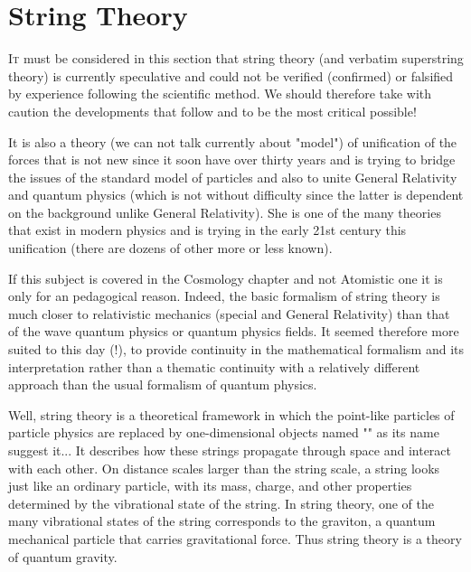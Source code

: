 	\newpage
	\thispagestyle{empty}
	\mbox{}
	\section{String Theory}
	\lettrine[lines=4]{\color{BrickRed}I}t must be considered in this section that string theory (and verbatim superstring theory) is currently speculative and could not be verified (confirmed) or falsified by experience following the scientific method. We should therefore take with caution the developments that follow and to be the most critical possible!
	
	It is also a theory (we can not talk currently about "model") of unification of the forces that is not new since it soon have over thirty years and is trying to bridge the issues of the standard model of particles and also to unite General Relativity and quantum physics (which is not without difficulty since the latter is dependent on the background unlike General Relativity). She is one of the many theories that exist in modern physics and is trying in the early 21st century this unification (there are dozens of other more or less known).
	
	\begin{tcolorbox}[title=Remark,colframe=black,arc=10pt]
	If this subject is covered in the Cosmology chapter and not Atomistic one it is only for an pedagogical reason. Indeed, the basic formalism of string theory is much closer to relativistic mechanics (special and General Relativity) than that of the wave quantum physics or quantum physics fields. It seemed therefore more suited to this day (!), to provide continuity in the mathematical formalism and its interpretation rather than a thematic continuity with a relatively different approach than the usual formalism of quantum physics.
	\end{tcolorbox}
	Well, string theory is a theoretical framework in which the point-like particles of particle physics are replaced by one-dimensional objects named "" as its name suggest it... It describes how these strings propagate through space and interact with each other. On distance scales larger than the string scale, a string looks just like an ordinary particle, with its mass, charge, and other properties determined by the vibrational state of the string. In string theory, one of the many vibrational states of the string corresponds to the graviton, a quantum mechanical particle that carries gravitational force. Thus string theory is a theory of quantum gravity.

